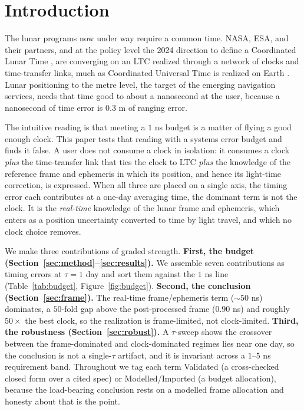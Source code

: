 \documentclass[conference]{IEEEtran}
\begin{document}
\section{Introduction}
The lunar programs now under way require a common time. NASA, ESA, and their
partners, and at the policy level the 2024 direction to define a Coordinated Lunar
Time \cite{ltcpolicy}, are converging on an LTC realized through a network of clocks
and time-transfer links, much as Coordinated Universal Time is realized on Earth
\cite{iaulctime,ashby2024,bourgoin2026}. Lunar positioning to the metre level, the
target of the emerging navigation services, needs that time good to about a
nanosecond at the user, because a nanosecond of time error is $0.3$ m of ranging
error.

The intuitive reading is that meeting a $1$ ns budget is a matter of flying a good
enough clock. This paper tests that reading with a systems error budget and finds it
false. A user does not consume a clock in isolation: it consumes a clock \emph{plus}
the time-transfer link that ties the clock to LTC \emph{plus} the knowledge of the
reference frame and ephemeris in which its position, and hence its light-time
correction, is expressed. When all three are placed on a single axis, the timing
error each contributes at a one-day averaging time, the dominant term is not the
clock. It is the \emph{real-time} knowledge of the lunar frame and ephemeris, which
enters as a position uncertainty converted to time by light travel, and which no
clock choice removes.

We make three contributions of graded strength. \textbf{First, the budget
(Section~\ref{sec:method}--\ref{sec:results}).} We assemble seven contributions as
timing errors at $\tau=1$ day and sort them against the $1$ ns line
(Table~\ref{tab:budget}, Figure~\ref{fig:budget}). \textbf{Second, the conclusion
(Section~\ref{sec:frame}).} The real-time frame/ephemeris term ($\sim$$50$ ns)
dominates, a $50$-fold gap above the post-processed frame ($0.90$ ns) and roughly
$50\times$ the best clock, so the realization is frame-limited, not clock-limited.
\textbf{Third, the robustness (Section~\ref{sec:robust}).} A $\tau$-sweep shows the
crossover between the frame-dominated and clock-dominated regimes lies near one day,
so the conclusion is not a single-$\tau$ artifact, and it is invariant across a
$1$--$5$ ns requirement band. Throughout we tag each term Validated (a cross-checked
closed form over a cited spec) or Modelled/Imported (a budget allocation), because
the load-bearing conclusion rests on a modelled frame allocation and honesty about
that is the point.
\end{document}
